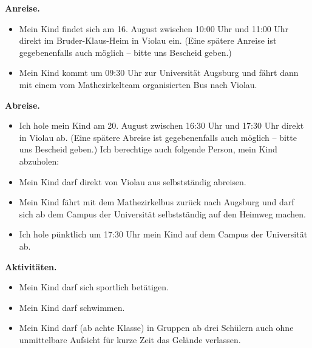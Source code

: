 \documentclass{zettel}
\begin{document}
\begin{shaded}
\textbf{Anreise.}
\begin{itemize}
\item[\checkbox] Mein Kind findet sich am 16. August zwischen 10:00 Uhr und 11:00
Uhr direkt im Bruder-Klaus-Heim in Violau ein. (Eine spätere Anreise ist
gegebenenfalls auch möglich -- bitte uns Bescheid geben.)
\item[\checkbox] Mein Kind kommt um 09:30 Uhr zur Universität
Augsburg und fährt dann mit einem vom Mathezirkelteam organisierten Bus nach Violau.
\end{itemize}
\end{shaded}

\begin{shaded}
\textbf{Abreise.}
\begin{itemize}
\item[\checkbox] Ich hole mein Kind am 20. August zwischen 16:30 Uhr und 17:30
Uhr direkt in Violau ab. (Eine spätere Abreise ist gegebenenfalls auch möglich
-- bitte uns Bescheid geben.) Ich berechtige auch folgende Person, mein Kind
abzuholen:

\vspace{0.3em}
\freistLang
\item[\checkbox] Mein Kind darf direkt von Violau aus selbstständig abreisen.
\item[\checkbox] Mein Kind fährt mit dem Mathezirkelbus zurück nach Augsburg und darf sich
ab dem Campus der Universität selbstständig auf den Heimweg machen.
\item[\checkbox] Ich hole pünktlich um 17:30 Uhr mein Kind auf dem Campus der
Universität ab.
\end{itemize}
\end{shaded}

\begin{shaded}
\textbf{Aktivitäten.}
\begin{itemize}
  \item[\checkbox] Mein Kind darf sich sportlich betätigen.
  \item[\checkbox] Mein Kind darf schwimmen.
  \item[\checkbox] Mein Kind darf (ab achte Klasse) in Gruppen ab drei Schülern
  auch ohne unmittelbare Aufsicht für kurze Zeit das Gelände verlassen.
\end{itemize}
\end{shaded}
\end{document}
